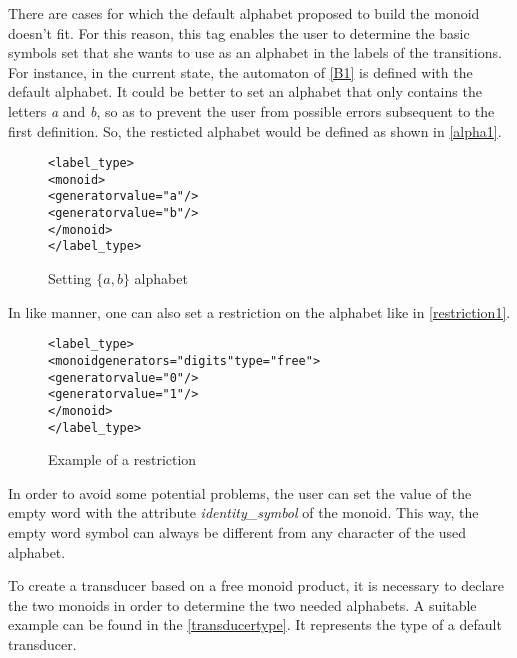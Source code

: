\documentclass[a4paper]{article}
\begin{document}
There are cases for which the default alphabet proposed to build the
monoid doesn't fit. For this reason, this tag enables the user to
determine the basic symbols set that she wants to use as an alphabet in the
labels of the transitions.\\

For instance, in the current state, the automaton of \autoref{B1} is
defined with the default alphabet. It could be better to set an alphabet that
only contains the letters \textit{a} and \textit{b}, so as to prevent the user
from possible errors subsequent to the first definition. So, the resticted
alphabet would be defined as shown in \autoref{alpha1}.

{\small

\begin{figure}[h]
  \begin{center}
\begin{alltt}
<label_type>
  <monoid>
     <generator value="a"/>
     <generator value="b"/>
  </monoid>
</label_type>
\end{alltt}

\caption{Setting $\{a, b\}$ alphabet}
\label{alpha1}
  \end{center}
\end{figure}
}

In like manner, one can also set a restriction on the alphabet like in
\autoref{restriction1}.

{\small

\begin{figure}[h]
  \begin{center}
\begin{alltt}
<label_type>
  <monoid generators="digits" type="free">
    <generator value="0"/>
    <generator value="1"/>
  </monoid>
</label_type>
\end{alltt}

\caption{Example of a restriction}
\label{restriction1}
  \end{center}
\end{figure}
}

In order to avoid some potential problems, the user can set the value of the
empty word with the attribute \textit{identity\_symbol} of the monoid. This way,
the empty word symbol can always be different from any character of the used
alphabet.

To create a transducer based on a free monoid product, it is necessary to
declare the two monoids in order to determine the two needed alphabets. A
suitable example can be found in the \autoref{transducertype}. It represents
the type of a default transducer.\\
\end{document}
